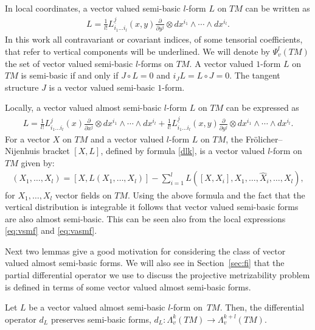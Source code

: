 In local coordinates, a vector valued semi-basic $l$-form $L$ on
$TM$ can be written as
\begin{gather}
L=\frac{1}{l!}L^{\underline{j}}_{i_1\dots i_l}(x,y)\frac{\partial}{\partial y^j}\otimes dx^{i_1}\wedge \cdots
\wedge dx^{i_l}.\label{eq:vsmf}
\end{gather} In this work all contravariant or covariant
indices, of some tensorial coef\/f\/icients, that refer to vertical components will be underlined. We
will denote by $\Psi^l_v(TM)$ the set of vector valued semi-basic
$l$-forms on $TM$. A vector valued $1$-form $L$ on $TM$ is
semi-basic if and only if $J\circ L=0$ and $i_JL=L \circ J=0$. The
tangent structure $J$ is a vector valued semi-basic $1$-form.

Locally, a vector valued almost semi-basic $l$-form $L$ on $TM$ can be
expressed as
\begin{gather}
 L =\frac{1}{l!}L^{j}_{i_1\dots i_l}(x)\frac{\partial}{\partial
x^j}\otimes dx^{i_1}\wedge \cdots \wedge dx^{i_l}  +
\frac{1}{l!}L^{\underline{j}}_{i_1\dots i_l}(x,y)\frac{\partial}{\partial
y^j}\otimes dx^{i_1}\wedge \cdots \wedge
dx^{i_l}.\label{eq:vasmf}
\end{gather}
For a vector $X$ on $TM$ and a vector valued $l$-form $L$
on $TM$, the Fr\"olicher--Nijenhuis bracket $[X,L]$, def\/ined by formula
\eqref{dlk}, is a vector valued $l$-form on $TM$ given by:
\begin{gather*}
[X,L](X_1,\dots ,X_l)=[X,L(X_1,\dots ,X_l)] - \sum_{i=1}^lL([X,X_i],
X_1,\dots ,\hat{X}_i,\dots ,X_l),  %
\end{gather*}
for $X_1, \dots , X_l$ vector f\/ields on $TM$. Using the above formula and the fact that the vertical distribution is integrable it
follows that vector valued semi-basic forms are also almost
semi-basic. This can be seen also from the local expressions
\eqref{eq:vsmf} and \eqref{eq:vasmf}.

Next two lemmas give a good motivation for considering the class of vector
valued almost semi-basic forms. We will also see in Section~\ref{sec:fi} that the partial
dif\/ferential operator we use to discuss the projective metrizability
problem is def\/ined in terms of some vector valued almost
semi-basic forms.

\begin{Lemma} \label{lem:dlomega} Let $L$ be a vector valued almost semi-basic $l$-form on~$TM$.
Then, the differential operator $d_L$ preserves semi-basic forms,
$d_L: \Lambda^k_v(TM) \to \Lambda^{k+l}_v(TM).$
\end{Lemma}

